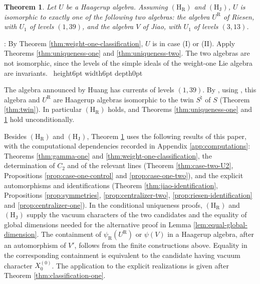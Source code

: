\documentclass[leqno]{article}
\newcommand{\qed}{\hfill \vrule height6pt  width6pt depth0pt}
\newtheorem{thm}{Theorem}[section]
\newenvironment{proof}[1][]{\noindent {\it Proof #1} : }{\hbox{~}\qed
\smallskip
}
\numberwithin{equation}{section}
\begin{document}
\begin{thm}
\label{thm:classification}
Let $U$ be a Haagerup algebra. Assuming $\mathrm{(H_R)}$ and $\mathrm{(H_J)}$, $U$ is isomorphic to exactly one of the following two algebras: the algebra $U^{\mathrm R}$ of Riesen, with $U_1$ of levels $(1,39)$, and the algebra $V$ of Jiao, with $U_1$ of levels $(3,13)$.
\end{thm}

\begin{proof}
By Theorem \ref{thm:weight-one-classification}, $U$ is in case (I) or (II). Apply Theorems \ref{thm:uniqueness-one} and \ref{thm:uniqueness-two}. The two algebras are not isomorphic, since the levels of the simple ideals of the weight-one Lie algebra are invariants.
\end{proof}

The algebra announced by Huang \cite{Hua26} has currents of levels $(1,39)$. By \cite[Theorem 7.9, Corollary 7.10 and Theorem 7.13]{ArhIII}, using \cite[Proposition 4.1 and Theorem 7.3]{DJX26}, this algebra and $U^{\mathrm R}$ are Haagerup algebras isomorphic to the twin $S^\natural$ of $S$ (Theorem \ref{thm:twin}). In particular $\mathrm{(H_R)}$ holds, and Theorems \ref{thm:uniqueness-one} and \ref{thm:classification} hold unconditionally.

Besides $\mathrm{(H_R)}$ and $\mathrm{(H_J)}$, Theorem \ref{thm:classification} uses the following results of this paper, with the computational dependencies recorded in Appendix \ref{app:computations}: Theorems \ref{thm:gamma-one} and \ref{thm:weight-one-classification}, the determination of $C_2$ and of the relevant lines (Theorem \ref{thm:case-two-U2}, Propositions \ref{prop:case-one-control} and \ref{prop:case-one-two}), and the explicit automorphisms and identifications (Theorem \ref{thm:jiao-identification}, Propositions \ref{prop:symmetries}, \ref{prop:centralizer-two}, \ref{prop:riesen-identification} and \ref{prop:centralizer-one}). In the conditional uniqueness proofs, $\mathrm{(H_R)}$ and $\mathrm{(H_J)}$ supply the vacuum characters of the two candidates and the equality of global dimensions needed for the alternative proof in Lemma \ref{lem:equal-global-dimension}. The containment of $\psi_{\mathrm R}(U^{\mathrm R})$ or $\psi(V)$ in a Haagerup algebra, after an automorphism of $V'$, follows from the finite constructions above. Equality in the corresponding containment is equivalent to the candidate having vacuum character $X^{(0)}_0$. The application to the explicit realizations is given after Theorem \ref{thm:classification-one}.
\end{document}
